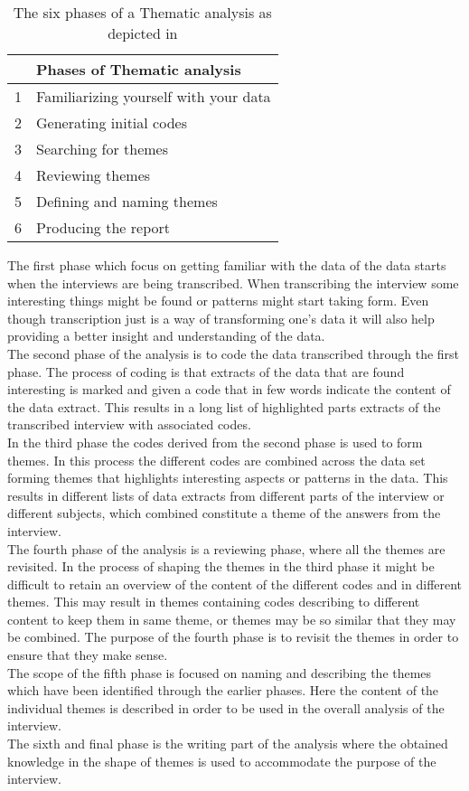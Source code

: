 \begin{table}[H]
\centering
\begin{tabular}[width=\textwidth]{cl}
\hline
& Phases of Thematic analysis \\ \hline
1 & Familiarizing yourself with your data \\
2 & Generating initial codes \\
3 & Searching for themes \\
4 & Reviewing themes \\
5 & Defining and naming themes\\
6 & Producing the report \\ \hline
\end{tabular}
\caption{The six phases of a Thematic analysis as depicted in \parencite[87]{PDF:Braun2006}}
\label{ThematicPhases}
\end{table}

The first phase which focus on getting familiar with the data of the data starts when the interviews are being transcribed. When transcribing the interview some interesting things might be found or patterns might start taking form. Even though transcription just is a way of transforming one's data it will also help providing a better insight and understanding of the data.\\
The second phase of the analysis is to code the data transcribed through the first phase. The process of coding is that extracts of the data that are found interesting is marked and given a code that in few words indicate the content of the data extract. This results in a long list of highlighted parts extracts of the transcribed interview with associated codes. \\
In the third phase the codes derived from the second phase is used to form themes. In this process the different codes are combined across the data set forming themes that highlights interesting aspects or patterns in the data. This results in different lists of data extracts from different parts of the interview or different subjects, which combined constitute a theme of the answers from the interview.\\
The fourth phase of the analysis is a reviewing phase, where all the themes are revisited. In the process of shaping the themes in the third phase it might be difficult to retain an overview of the content of the different codes and in different themes. This may result in themes containing codes describing to different content to keep them in same theme, or themes may be so similar that they may be combined. The purpose of the fourth phase is to revisit the themes in order to ensure that they make sense. \\
The scope of the fifth phase is focused on naming and describing the themes which have been identified through the earlier phases. Here the content of the individual themes is described in order to be used in the overall analysis of the interview.\\
The sixth and final phase is the writing part of the analysis where the obtained knowledge in the shape of themes is used to accommodate the purpose of the interview.\\



